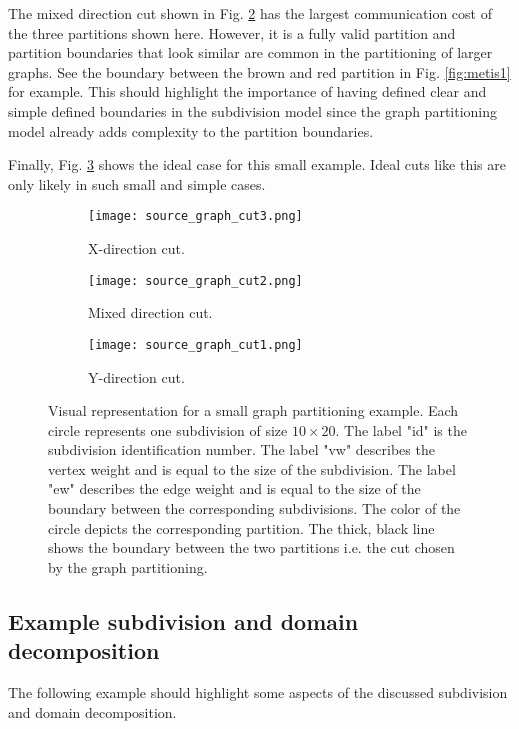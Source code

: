 The mixed direction cut shown in Fig. \ref{fig:cut2} has the largest communication cost of the three partitions shown here.
However, it is a fully valid partition and partition boundaries that look similar are common in the partitioning of larger graphs.
See the boundary between the brown and red partition in Fig. \ref{fig:metis1} for example.
This should highlight the importance of having defined clear and simple defined boundaries in the subdivision model since the graph partitioning model already adds complexity to the partition boundaries.

Finally, Fig. \ref{fig:cut3} shows the ideal case for this small example.
Ideal cuts like this are only likely in such small and simple cases.

\begin{figure}[!htbp]
\centering
\begin{subfigure}{0.43\textwidth}
  \centering
  \texttt{[image: source\_graph\_cut3.png]}
  \caption{X-direction cut.}
  \label{fig:cut1}
\end{subfigure}%

\begin{subfigure}{0.43\textwidth}
  \centering
  \texttt{[image: source\_graph\_cut2.png]}
  \caption{Mixed direction cut.}
  \label{fig:cut2}
\end{subfigure}%

\begin{subfigure}{0.43\textwidth}
  \centering
  \texttt{[image: source\_graph\_cut1.png]}
  \caption{Y-direction cut.}
  \label{fig:cut3}
\end{subfigure}\hfill
\caption{Visual representation for a small graph partitioning example.
Each circle represents one subdivision of size $10 \times 20$.
The label "id" is the subdivision identification number.
The label "vw" describes the vertex weight and is equal to the size of the subdivision.
The label "ew" describes the edge weight and is equal to the size of the boundary between the corresponding subdivisions.
The color of the circle depicts the corresponding partition.
The thick, black line shows the boundary between the two partitions i.e. the cut chosen by the graph partitioning.}
\label{fig:sourcegraph}
\end{figure}

\subsection{Example subdivision and domain decomposition}
\label{sec:examplesubdivision}
The following example should highlight some aspects of the discussed subdivision and domain decomposition.

